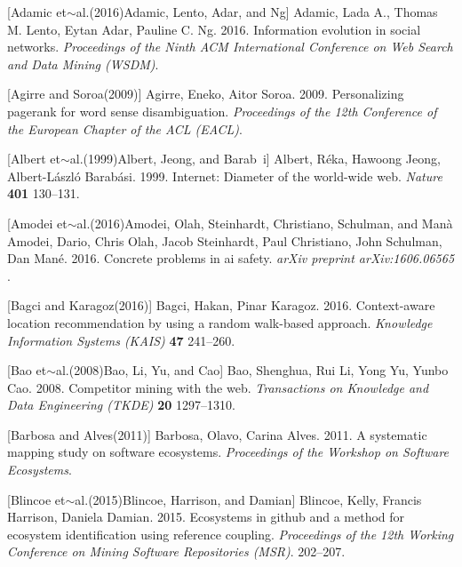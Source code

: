\documentclass{article} %
\begin{document}
\noindent 

[Adamic et$\sim$al.(2016)Adamic, Lento, Adar, and Ng]  Adamic, Lada A., Thomas M. Lento, Eytan Adar, Pauline C. Ng. 2016.    Information evolution in social networks.    \textit{ Proceedings of the Ninth ACM International Conference on Web Search and Data Mining (WSDM)}.

\noindent 

[Agirre and Soroa(2009)]  Agirre, Eneko, Aitor Soroa. 2009.    Personalizing pagerank for word sense disambiguation.    \textit{ Proceedings of the 12th Conference of the European Chapter of the ACL (EACL)}.

\noindent 

[Albert et$\sim$al.(1999)Albert, Jeong, and Barab~i]  Albert, R\'{e}ka, Hawoong Jeong, Albert-L\'{a}szl\'{o} Barab\'{a}si. 1999.    Internet: Diameter of the world-wide web.    \textit{ Nature} \textbf{ 401} 130--131.

\noindent 

[Amodei et$\sim$al.(2016)Amodei, Olah, Steinhardt, Christiano, Schulman, and Man\`{a}  Amodei, Dario, Chris Olah, Jacob Steinhardt, Paul Christiano, John Schulman, Dan Man\'{e}. 2016.    Concrete problems in ai safety.    \textit{ arXiv preprint arXiv:1606.06565} .

\noindent 

[Bagci and Karagoz(2016)]  Bagci, Hakan, Pinar Karagoz. 2016.    Context-aware location recommendation by using a random walk-based approach.    \textit{ Knowledge Information Systems (KAIS)} \textbf{ 47} 241--260.

\noindent 

[Bao et$\sim$al.(2008)Bao, Li, Yu, and Cao]  Bao, Shenghua, Rui Li, Yong Yu, Yunbo Cao. 2008.    Competitor mining with the web.    \textit{ Transactions on Knowledge and Data Engineering (TKDE)} \textbf{ 20} 1297--1310.

\noindent 

[Barbosa and Alves(2011)]  Barbosa, Olavo, Carina Alves. 2011.    A systematic mapping study on software ecosystems.    \textit{ Proceedings of the Workshop on Software Ecosystems}.

\noindent 

[Blincoe et$\sim$al.(2015)Blincoe, Harrison, and Damian]  Blincoe, Kelly, Francis Harrison, Daniela Damian. 2015.    Ecosystems in github and a method for ecosystem identification using reference coupling.    \textit{ Proceedings of the 12th Working Conference on Mining Software Repositories (MSR)}. 202--207.
\end{document}
